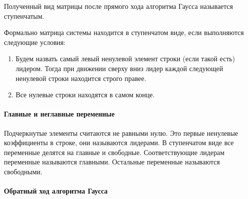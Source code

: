 Полученный вид матрицы после прямого хода алгоритма Гаусса называется ступенчатым.
\begin{definition}
\label{def::LadderForm}
Формально матрица системы находится в ступенчатом виде, если выполняются следующие условия:
\begin{enumerate}
\item Будем назвать самый левый ненулевой элемент строки (если такой есть) лидером. Тогда при движении сверху вниз лидер каждой следующей ненулевой строки находится строго правее.

\item Все нулевые строки находятся в самом конце.
\end{enumerate}
\end{definition}

\paragraph{Главные и неглавные переменные}

Подчеркнутые элементы считаются не равными нулю.
Это первые ненулевые коэффициенты в строке, они называются лидерами.
В ступенчатом виде все переменные делятся на главные и свободные.
Соответствующие лидерам переменные называются главными.
Остальные переменные называются свободными.

\paragraph{Обратный ход алгоритма Гаусса}

